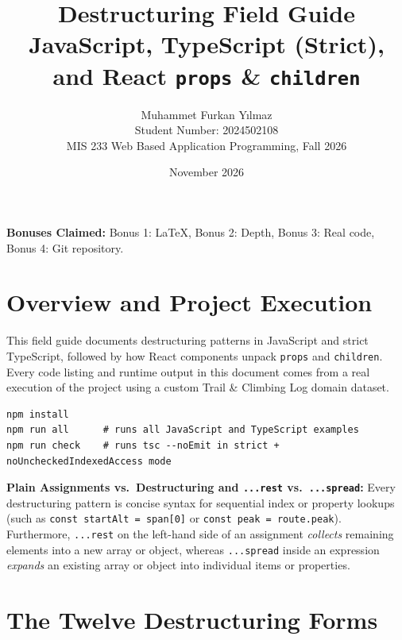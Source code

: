 \documentclass[11pt, a4paper]{article}
\title{\textbf{Destructuring Field Guide}\\
\large JavaScript, TypeScript (Strict), and React \texttt{props} \& \texttt{children}}
\author{Muhammet Furkan Yılmaz \\ Student Number: 2024502108 \\ \small MIS 233 Web Based Application Programming, Fall 2026}
\date{November 2026}
\begin{document}
\maketitle

\noindent\textbf{Bonuses Claimed:} Bonus 1: LaTeX, Bonus 2: Depth, Bonus 3: Real code, Bonus 4: Git repository.

\tableofcontents
\newpage

\section{Overview and Project Execution}

This field guide documents destructuring patterns in JavaScript and strict TypeScript, followed by how React components unpack \texttt{props} and \texttt{children}. Every code listing and runtime output in this document comes from a real execution of the project using a custom Trail \& Climbing Log domain dataset.

\begin{lstlisting}
npm install
npm run all      # runs all JavaScript and TypeScript examples
npm run check    # runs tsc --noEmit in strict + noUncheckedIndexedAccess mode
\end{lstlisting}

\noindent\textbf{Plain Assignments vs.\ Destructuring and \texttt{...rest} vs.\ \texttt{...spread}:}
Every destructuring pattern is concise syntax for sequential index or property lookups (such as \texttt{const startAlt = span[0]} or \texttt{const peak = route.peak}). Furthermore, \texttt{...rest} on the left-hand side of an assignment \emph{collects} remaining elements into a new array or object, whereas \texttt{...spread} inside an expression \emph{expands} an existing array or object into individual items or properties.

\section{The Twelve Destructuring Forms}
\end{document}
